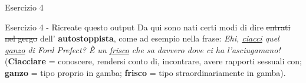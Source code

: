 \begin{frame}{Esercizio 4}

\begin{esercizio}{Esercizio 4 - Ricreate questo output}
Da qui sono nati certi modi di dire \sout{entrati nel gergo} dell'
\textbf{autostoppista}, come ad esempio nella frase: \textit{Ehi, 
\underline{ciacci} quel \underline{ganzo} di Ford Prefect? È un
\underline{frisco} che sa davvero dove ci ha l’asciugamano!} (\textbf{Ciacciare}
 = conoscere, rendersi conto di, incontrare, avere rapporti sessuali con; 
\textbf{ganzo} = tipo proprio in gamba; \textbf{frisco} = tipo
straordinariamente in gamba).
\end{esercizio}

\end{frame}

